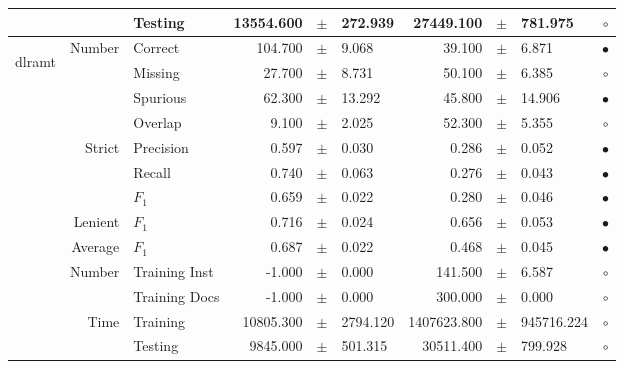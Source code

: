 \begin{longtable}{|r|r|l||rcl|rcl|c|}
&                             &         Testing &   13554.600 &  $\pm$  &     272.939 &   27449.100 &  $\pm$  &     781.975 & $\circ$ \\
\hline
\hline
\multirow{11}{*}{\begin{sideways}dlramt\end{sideways} }
& \multirow{4}{*}{    Number} &         Correct &     104.700 &  $\pm$  &       9.068 &      39.100 &  $\pm$  &       6.871 & $\bullet$ \\
&                             &         Missing &      27.700 &  $\pm$  &       8.731 &      50.100 &  $\pm$  &       6.385 & $\circ$ \\
&                             &        Spurious &      62.300 &  $\pm$  &      13.292 &      45.800 &  $\pm$  &      14.906 & $\bullet$ \\
&                             &         Overlap &       9.100 &  $\pm$  &       2.025 &      52.300 &  $\pm$  &       5.355 & $\circ$ \\
& \multirow{3}{*}{    Strict} &       Precision &       0.597 &  $\pm$  &       0.030 &       0.286 &  $\pm$  &       0.052 & $\bullet$ \\
&                             &          Recall &       0.740 &  $\pm$  &       0.063 &       0.276 &  $\pm$  &       0.043 & $\bullet$ \\
&                             &           $F_1$ &       0.659 &  $\pm$  &       0.022 &       0.280 &  $\pm$  &       0.046 & $\bullet$ \\
&                     Lenient &           $F_1$ &       0.716 &  $\pm$  &       0.024 &       0.656 &  $\pm$  &       0.053 & $\bullet$ \\
&                     Average &           $F_1$ &       0.687 &  $\pm$  &       0.022 &       0.468 &  $\pm$  &       0.045 & $\bullet$ \\
& \multirow{2}{*}{    Number} &   Training Inst &      -1.000 &  $\pm$  &       0.000 &     141.500 &  $\pm$  &       6.587 & $\circ$ \\
&                             &   Training Docs &      -1.000 &  $\pm$  &       0.000 &     300.000 &  $\pm$  &       0.000 & $\circ$ \\
& \multirow{2}{*}{      Time} &        Training &   10805.300 &  $\pm$  &    2794.120 & 1407623.800 &  $\pm$  &  945716.224 & $\circ$ \\
&                             &         Testing &    9845.000 &  $\pm$  &     501.315 &   30511.400 &  $\pm$  &     799.928 & $\circ$ \\

\end{longtable}
